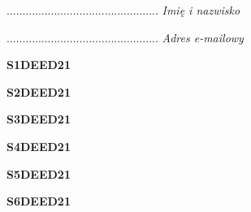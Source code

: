 \begin{turn}{90}\begin{minipage}{\linewidth} \vspace{20mm} ................................................  \textit{Imię i nazwisko}\end{minipage}\end{turn}

\begin{turn}{90}\begin{minipage}{\linewidth} \vspace{20mm} ................................................  \textit{Adres e-mailowy}\end{minipage}\end{turn}

\begin{turn}{90}\huge \begin{minipage}{\linewidth} \vspace{10mm}\textbf{S1DEED21}\end{minipage}\end{turn}

\begin{turn}{90}\huge \begin{minipage}{\linewidth} \vspace{10mm}\textbf{S2DEED21}\end{minipage}\end{turn}

\begin{turn}{90}\huge \begin{minipage}{\linewidth} \vspace{10mm}\textbf{S3DEED21}\end{minipage}\end{turn}

\begin{turn}{90}\huge \begin{minipage}{\linewidth} \vspace{10mm}\textbf{S4DEED21}\end{minipage}\end{turn}

\begin{turn}{90}\huge \begin{minipage}{\linewidth} \vspace{10mm}\textbf{S5DEED21}\end{minipage}\end{turn}

\begin{turn}{90}\huge \begin{minipage}{\linewidth} \vspace{10mm}\textbf{S6DEED21}\end{minipage}\end{turn}

